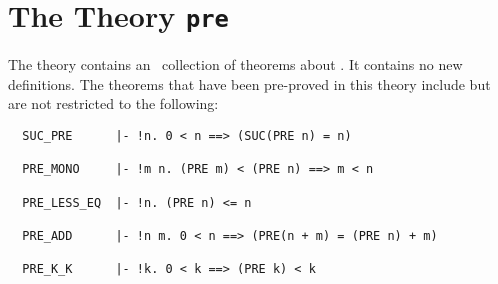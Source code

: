 \section{The Theory {\tt pre}}

The theory  contains an
\adhoc\ collection of 
theorems about . It contains no new definitions.
The theorems that have been pre-proved in this theory include but are not
restricted to the following:
\begin{hol}
\begin{verbatim}
  SUC_PRE      |- !n. 0 < n ==> (SUC(PRE n) = n)

  PRE_MONO     |- !m n. (PRE m) < (PRE n) ==> m < n

  PRE_LESS_EQ  |- !n. (PRE n) <= n

  PRE_ADD      |- !n m. 0 < n ==> (PRE(n + m) = (PRE n) + m)

  PRE_K_K      |- !k. 0 < k ==> (PRE k) < k
\end{verbatim}\end{hol}
